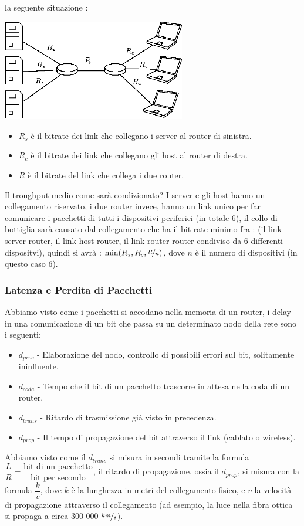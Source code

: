 \documentclass[12pt, letterpaper]{article}
\begin{document}
la seguente situazione :\begin{center}
    \includegraphics[width=0.6\textwidth ]{images/troughput.eps}
\end{center}\begin{itemize}
    \item $R_s$ è il bitrate dei link che collegano i server al router di sinistra.
    \item $R_c$ è il bitrate dei link che collegano gli host al router di destra.
    \item $R$ è il bitrate del link che collega i due router.
\end{itemize}
Il troughput medio come sarà condizionato? I server e gli host hanno un collegamento riservato, i due router
invece, hanno un link unico per far comunicare i pacchetti di tutti i dispositivi periferici (in totale 6),
il collo di bottiglia sarà causato dal collegamento che ha il bit rate minimo fra : (il link server-router, il link
host-router, il link router-router condiviso da 6 differenti dispositvi), quindi si avrà : $\min(R_s,R_c,\nicefrac{R}{n})$, dove
$n$ è il numero di dispositivi (in questo caso 6).
\subsubsection{Latenza e Perdita di Pacchetti}
Abbiamo visto come i pacchetti si accodano nella memoria di un router, i delay in una comunicazione di un bit
che passa su un determinato nodo della rete sono i seguenti:
\begin{itemize}
    \item $d_{proc}$ - Elaborazione del nodo, controllo di possibili errori sul bit, solitamente ininfluente.
    \item $d_{coda}$ - Tempo che il bit di un pacchetto trascorre in attesa nella coda di un router.
    \item $d_{trans}$ - Ritardo di trasmissione già visto in precedenza.
    \item $d_{prop}$ - Il tempo di propagazione del bit attraverso il link (cablato o wireless).
\end{itemize}
Abbiamo visto come il $d_{trans}$ si misura in secondi tramite la formula
$\dfrac{L}{R}=\dfrac{\text{bit di un pacchetto}}{\text{bit per secondo}}$, il ritardo di propagazione, ossia
il $d_{prop}$, si misura con la formula $\dfrac{k}{v}$, dove $k$ è la lunghezza in metri del collegamento
fisico, e $v$ la velocità di propagazione attraverso il collegamento (ad esempio, la luce nella fibra ottica
si propaga a circa 300 000 $\nicefrac{km}{s}$).
\end{document}
